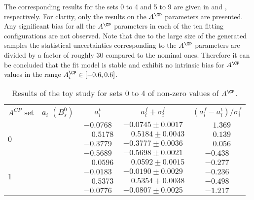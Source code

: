 The corresponding results for the sets 0 to 4 and 5 to 9 are given in  and , respectively. For clarity, only the results on the $A^{\CP}$ parameters are presented. Any significant bias for all the $A^{\CP}$ parameters in each of the ten fitting configurations are not observed. Note that due to the large size of the generated samples the statistical uncertainties corresponding to the $A^{\CP}$ parameters are divided by a factor of roughly 30 compared to the nominal ones. Therefore it can be concluded that the fit model is stable and exhibit no intrinsic bias for $A^{\CP}$ values in the range $A^{\CP}_i \in [-0.6,0.6]$. 
%
\begin{table}[htbp]
\begin{center}
\caption[Results of the toy study for sets 0 to 4 of non-zero values of $A^{\CP}$]{\label{tab:NZACPs_AllsetsA} Results of the toy study for sets 0 to 4 of non-zero values of $A^{\CP}$.}
\vspace{5pt}
\begin{tabular}{l|c|c|c|c}
\multirow{2}{*}{$A^{C\!P}$ set}
 & \multirow{2}{*}{$a_i$ $(B^0_s)$} & \multirow{2}{*}{ $a_i^t $ } & \multirow{2}{*}{$a_i^f \pm \sigma_i^f $} & \multirow{2}{*}{$(a_i^f - a_i^t)/\sigma_i^f  $} \\
				&	       &	 					  &   &	\\	
\hline

 \multirow{4}{*}{0}	&	\ACPL 	&$	-0.0768	$&$	-0.0745		\pm		0.0017	$&$	\phantom{-}1.369	 $\\
	&	\ACPS 	&$	\phantom{-}0.5178	$&$	\phantom{-}0.5184		\pm		0.0043	$&$	\phantom{-}0.139	 $\\
	&	\ACPpa 	&$	-0.3779	$&$	-0.3777		\pm		0.0036	$&$	\phantom{-}0.056	 $\\
	&	\ACPpe 	&$	-0.5689	$&$	-0.5698		\pm		0.0021	$&$	-0.438	 $\\
													
\hline													
													
 \multirow{4}{*}{1}	&	\ACPL 	&$	\phantom{-}0.0596	$&$	\phantom{-}0.0592		\pm		0.0015	$&$	-0.277	 $\\
	&	\ACPS 	&$	-0.0183	$&$	-0.0190		\pm		0.0029	$&$	-0.236	 $\\
	&	\ACPpa 	&$	\phantom{-}0.5373	$&$	\phantom{-}0.5354		\pm		0.0038	$&$	-0.498	 $\\
	&	\ACPpe 	&$	-0.0776	$&$	-0.0807		\pm		0.0025	$&$	-1.217	 $\\
													
\hline													
													

\end{tabular}
\end{center}
\end{table}
